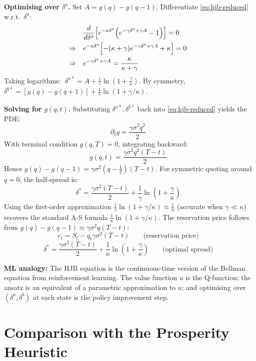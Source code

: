 \documentclass[12pt,a4paper,openany]{report}
\theoremstyle{definition}
\begin{document}
\textbf{Optimising over $\delta^a$.} Set $A = g(q)-g(q-1)$. Differentiate \eqref{eq:hjb-reduced} w.r.t.\ $\delta^a$:
\begin{align}
  &\frac{d}{d\delta^a}\!\left[e^{-\kappa\delta^a}\!\left(e^{-\gamma\delta^a+\gamma A}-1\right)\right] = 0 \notag \\
  \Rightarrow\quad
  &e^{-\kappa\delta^a}\!\left[-(\kappa+\gamma)e^{-\gamma\delta^a+\gamma A}+\kappa\right] = 0 \notag \\
  \Rightarrow\quad
  &e^{-\gamma\delta^a+\gamma A} = \frac{\kappa}{\kappa+\gamma}
\end{align}
Taking logarithms: $\;\delta^{a*} = A + \frac{1}{\gamma}\ln\!\left(1+\frac{\gamma}{\kappa}\right)$. By symmetry, $\delta^{b*} = [g(q)-g(q+1)] + \frac{1}{\gamma}\ln(1+\gamma/\kappa)$.

\textbf{Solving for $g(q,t)$.} Substituting $\delta^{a*}, \delta^{b*}$ back into \eqref{eq:hjb-reduced} yields the PDE:
\[
  \partial_t g = \frac{\gamma\sigma^2 q^2}{2}
\]
With terminal condition $g(q,T)=0$, integrating backward:
\[
  g(q,t) = \frac{\gamma\sigma^2 q^2(T-t)}{2}
\]
Hence $g(q)-g(q-1) = \gamma\sigma^2(q-\tfrac{1}{2})(T-t)$. For symmetric quoting around $q=0$, the half-spread is:
\[
  \delta^* = \frac{\gamma\sigma^2(T-t)}{2} + \frac{1}{\gamma}\ln\!\left(1+\frac{\gamma}{\kappa}\right)
\]
Using the first-order approximation $\frac{1}{\gamma}\ln(1+\gamma/\kappa) \approx \frac{1}{\kappa}$ (accurate when $\gamma \ll \kappa$) recovers the standard A-S formula $\frac{1}{\kappa}\ln(1+\gamma/\kappa)$. The reservation price follows from $g(q)-g(q-1) \approx \gamma\sigma^2 q(T-t)$:
\[
  r_t = S_t - q_t \gamma \sigma^2 (T-t) \qquad \text{(reservation price)}
\]
\[
  \delta^* = \frac{\gamma\sigma^2(T-t)}{2} + \frac{1}{\kappa}\ln\!\left(1 + \frac{\gamma}{\kappa}\right) \qquad \text{(optimal spread)}
\]

\textbf{ML analogy:} The HJB equation is the continuous-time version of the Bellman equation from reinforcement learning. The value function $u$ is the Q-function; the ansatz is an equivalent of a parametric approximation to $u$; and optimising over $(\delta^a, \delta^b)$ at each state is the policy improvement step.

\section{Comparison with the Prosperity Heuristic}
\end{document}
